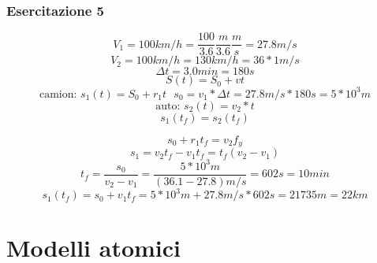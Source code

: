 \documentclass{book}
\begin{document}
\subsection{Esercitazione 5}
	\begin{equation*}
		V_1=100km/h=\frac{100}{3.6}\frac{m}{3.6}\frac{m}{s}=27.8m/s
	\end{equation*}
	\begin{equation*}
		V_2=100km/h=130km/h=36*1m/s
	\end{equation*}
	\begin{equation*}
		\Delta t=3.0min=180s
	\end{equation*}
	\begin{equation*}
		S(t)=S_0+vt
	\end{equation*}
	\begin{equation*}
		\text{camion: } s_1(t)=S_0+r_1t \text{ } s_0=v_1*\Delta
		t=27.8m/s*180s=5*10^3m
	\end{equation*}
	\begin{equation*}
		\text{auto: } s_2(t)=v_2*t
	\end{equation*}
	\begin{equation*}
		s_1(t_f)=s_2(t_f)
	\end{equation*}
\begin{multicols}{2}
	\begin{equation*}
		s_0+r_1t_f=v_2f_y
	\end{equation*}
	\begin{equation*}
		s_1=v_2t_f-v_1t_f=t_f(v_2-v_1)
	\end{equation*}
	\begin{equation*}
		\boxed{t_f=\frac{s_0}{v_2-v_1}}=\frac{5*10^3m}{(36.1-27.8)m/s}=602s=10min
	\end{equation*}
	\begin{equation*}
		s_1(t_f)=s_0+v_1t_f=5*10^3m+27.8m/s*602s=21735m=22km
	\end{equation*}

\end{multicols}
\chapter{Modelli atomici}
\end{document}
